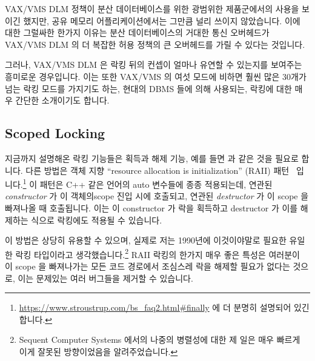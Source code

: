 VAX/VMS DLM 정책이 분산 데이터베이스를 위한 광범위한 제품군에서의 사용을 보이긴
했지만, 공유 메모리 어플리케이션에서는 그만큼 널리 쓰이지 않았습니다.
이에 대한 그럴싸한 한가지 이유는 분산 데이터베이스의 거대한 통신 오버헤드가
VAX/VMS DLM 의 더 복잡한 허용 정책의 큰 오버헤드를 가릴 수 있다는 것입니다.

그러나, VAX/VMS DLM 은 락킹 뒤의 컨셉이 얼마나 유연할 수 있는지를 보여주는
흥미로운 경우입니다.
이는 또한 VAX/VMS 의 여섯 모드에 비하면 훨씬 많은 30개가 넘는 락킹 모드를
가지기도 하는, 현대의 DBMS 들에 의해 사용되는, 락킹에 대한 매우 간단한
소개이기도 합니다.

\subsection{Scoped Locking}
\label{sec:locking:Scoped Locking}

지금까지 설명해온 락킹 기능들은 획득과 해제 기능, 예를 들면  과
 같은 것을 필요로 합니다.
다른 방법은 객체 지향 ``resource allocation is initialization'' (RAII)
패턴~\cite{MargaretAEllis1990Cplusplus} 입니다.\footnote{
	\url{https://www.stroustrup.com/bs_faq2.html\#finally} 에 더 분명히
	설명되어 있긴 합니다.}
이 패턴은 C++ 같은 언어의 auto 변수들에 종종 적용되는데, 연관된
\emph{constructor} 가 이 객체의scope 진입 시에 호출되고, 연관된
\emph{destructor} 가 이 scope 을 빠져나올 때 호출됩니다.
이는 이 constructor 가 락을 획득하고 destructor 가 이를 해제하는 식으로
락킹에도 적용될 수 있습니다.

이 방법은 상당히 유용할 수 있으며, 실제로 저는 1990년에 이것이야말로 필요한
유일한 락킹 타입이라고 생각했습니다.\footnote{
	Sequent Computer Systems 에서의 나중의 병렬성에 대한 제 일은 매우
	빠르게 이게 잘못된 방향이었음을 알려주었습니다.}
RAII 락킹의 한가지 매우 좋은 특성은 여러분이 이 scope 을 빠져나가는 모든 코드
경로에서 조심스레 락을 해제할 필요가 없다는 것으로, 이는 문제있는 여러 버그들을
제거할 수 있습니다.

